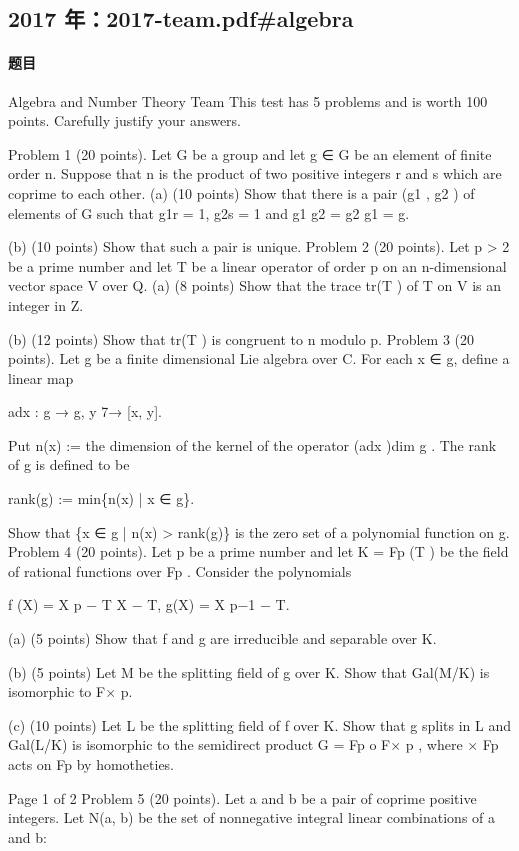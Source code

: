 \documentclass[UTF8,12pt]{ctexart}
\begin{document}
\subsection{2017 年：2017-team.pdf\#algebra}
\paragraph{题目}
Algebra and Number Theory Team This test has 5 problems and is worth 100 points. Carefully justify your answers.

Problem 1 (20 points). Let G be a group and let g ∈ G be an element of finite order n. Suppose that n is the product of two positive integers r and s which are coprime to each other. (a) (10 points) Show that there is a pair (g1 , g2 ) of elements of G such that g1r = 1, g2s = 1 and g1 g2 = g2 g1 = g.

(b) (10 points) Show that such a pair is unique. Problem 2 (20 points). Let p > 2 be a prime number and let T be a linear operator of order p on an n-dimensional vector space V over Q. (a) (8 points) Show that the trace tr(T ) of T on V is an integer in Z.

(b) (12 points) Show that tr(T ) is congruent to n modulo p. Problem 3 (20 points). Let g be a finite dimensional Lie algebra over C. For each x ∈ g, define a linear map

adx : g → g, y 7→ [x, y].

Put n(x) := the dimension of the kernel of the operator (adx )dim g . The rank of g is defined to be

rank(g) := min\{n(x) | x ∈ g\}.

Show that \{x ∈ g | n(x) > rank(g)\} is the zero set of a polynomial function on g. Problem 4 (20 points). Let p be a prime number and let K = Fp (T ) be the field of rational functions over Fp . Consider the polynomials

f (X) = X p − T X − T, g(X) = X p−1 − T.

(a) (5 points) Show that f and g are irreducible and separable over K.

(b) (5 points) Let M be the splitting field of g over K. Show that Gal(M/K) is isomorphic to F× p.

(c) (10 points) Let L be the splitting field of f over K. Show that g splits in L and Gal(L/K) is isomorphic to the semidirect product G = Fp o F× p , where × Fp acts on Fp by homotheties.

Page 1 of 2 Problem 5 (20 points). Let a and b be a pair of coprime positive integers. Let N(a, b) be the set of nonnegative integral linear combinations of a and b:
\end{document}
